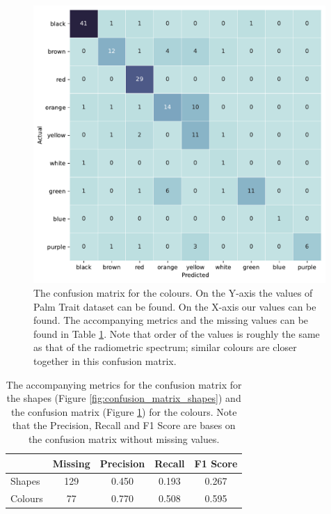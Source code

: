 \documentclass[a4paper, 12pt, oneside]{book} %
\begin{document}
\begin{figure}[htpb]
    \centering
    \includegraphics[width=0.99\textwidth]{figures/confusion_matrix_colours.pdf}
    \caption[Confusion matrix colours]{The confusion matrix for the colours. On the Y-axis the values of Palm Trait dataset can be found. On the X-axis our values can be found. The accompanying metrics and the missing values can be found in Table \ref{tab:confusion_matrix_metric_table}. Note that order of the values is roughly the same as that of the radiometric spectrum; similar colours are closer together in this confusion matrix.}
    \label{fig:confusion_matrix_colours}
\end{figure}

\begin{table}[htpb]
    \centering
    \caption[Accompanying metric for confusion matrices]{The accompanying metrics for the confusion matrix for the shapes (Figure \ref{fig:confusion_matrix_shapes}) and the confusion matrix (Figure \ref{fig:confusion_matrix_colours}) for the colours. Note that the Precision, Recall and F1 Score are bases on the confusion matrix without missing values.}
    \label{tab:confusion_matrix_metric_table}
    \begin{tabular}{@{}lcccc@{}}
    \cmidrule(l){2-5}
            & \multicolumn{1}{l}{\textbf{Missing}} & \multicolumn{1}{l}{\textbf{Precision}} & \multicolumn{1}{l}{\textbf{Recall}} & \multicolumn{1}{l}{\textbf{F1 Score}} \\ \midrule
    Shapes  & 129                                  & 0.450                                  & 0.193                              & 0.267                                 \\ \midrule
    Colours & 77                                   & 0.770                                  & 0.508                               & 0.595                                 \\ \bottomrule
    \end{tabular}
\end{table}
\end{document}
